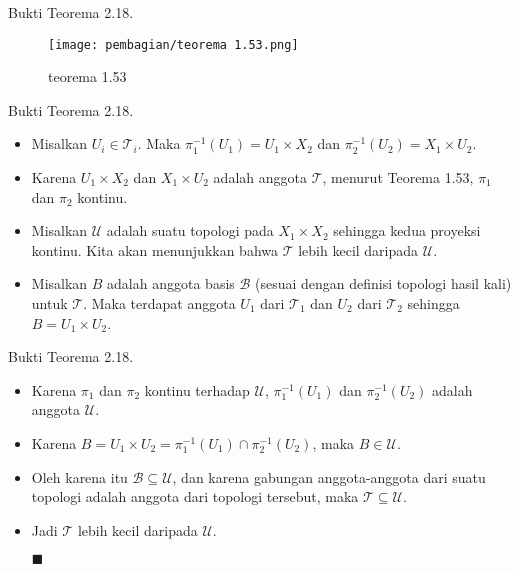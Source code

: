     \begin{frame}{Bukti Teorema 2.18.}
    \begin{figure}
        \centering
        \texttt{[image: pembagian/teorema 1.53.png]}
        \caption{teorema 1.53}
        \label{fig:enter-label}
    \end{figure}
    \end{frame}
    
    \begin{frame}{Bukti Teorema 2.18.}
    \begin{tcolorbox}[title=Bukti Teorema 2.18 (1/2)]
    \begin{itemize}
        \item Misalkan $U_i \in \mathcal{T}_i$. Maka $\pi_1^{-1}(U_1) = U_1 \times X_2$ dan $\pi_2^{-1}(U_2) = X_1 \times U_2$. 
        \item Karena $U_1 \times X_2$ dan $X_1 \times U_2$ adalah anggota $\mathcal{T}$, menurut Teorema 1.53, $\pi_1$ dan $\pi_2$ kontinu.
        \item Misalkan $\mathcal{U}$ adalah suatu topologi pada $X_1 \times X_2$ sehingga kedua proyeksi kontinu. Kita akan menunjukkan bahwa $\mathcal{T}$ lebih kecil daripada $\mathcal{U}$.
        \item  Misalkan $B$ adalah anggota basis $\mathcal{B}$ (sesuai dengan definisi topologi hasil kali) untuk $\mathcal{T}$. Maka terdapat anggota $U_1$ dari $\mathcal{T}_1$ dan $U_2$ dari $\mathcal{T}_2$ sehingga $B = U_1 \times U_2$.
        
        
    \end{itemize}
    \end{tcolorbox}
    \end{frame}
    
    \begin{frame}{Bukti Teorema 2.18.}
    \begin{tcolorbox}[title=Bukti Teorema 2.18 (2/2)]
    \begin{itemize}
        \item Karena $\pi_1$ dan $\pi_2$ kontinu terhadap $\mathcal{U}$, $\pi_1^{-1}(U_1)$ dan $\pi_2^{-1}(U_2)$ adalah anggota $\mathcal{U}$.
        \item Karena $B = U_1 \times U_2 = \pi_1^{-1}(U_1) \cap \pi_2^{-1}(U_2)$, maka $B \in \mathcal{U}$.
        \item Oleh karena itu $\mathcal{B} \subseteq \mathcal{U}$, dan karena gabungan anggota-anggota dari suatu topologi adalah anggota dari topologi tersebut, maka $\mathcal{T} \subseteq \mathcal{U}$.
        \item Jadi $\mathcal{T}$ lebih kecil daripada $\mathcal{U}$.
    
    \hfill $\blacksquare$
        
    \end{itemize}
    \end{tcolorbox}
    \end{frame}
    
